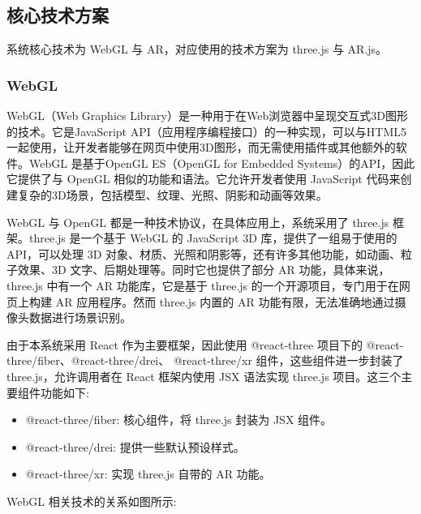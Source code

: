 \subsection{核心技术方案}

系统核心技术为 WebGL 与 AR，对应使用的技术方案为 three.js 与 AR.js。

\subsubsection{WebGL}

WebGL（Web Graphics Library）是一种用于在Web浏览器中呈现交互式3D图形的技术。它是JavaScript API（应用程序编程接口）的一种实现，可以与HTML5一起使用，让开发者能够在网页中使用3D图形，而无需使用插件或其他额外的软件\cite{min2018evaluation}。WebGL 是基于OpenGL ES（OpenGL for Embedded Systems）的API，因此它提供了与 OpenGL 相似的功能和语法。它允许开发者使用 JavaScript 代码来创建复杂的3D场景，包括模型、纹理、光照、阴影和动画等效果\cite{cantor2012webgl}。

WebGL 与 OpenGL 都是一种技术协议，在具体应用上，系统采用了 three.js 框架。three.js 是一个基于 WebGL 的 JavaScript 3D 库，提供了一组易于使用的 API，可以处理 3D 对象、材质、光照和阴影等，还有许多其他功能，如动画、粒子效果、3D 文字、后期处理等\cite{almansoury2020investigating}。同时它也提供了部分 AR 功能，具体来说，three.js 中有一个 AR 功能库，它是基于 three.js 的一个开源项目，专门用于在网页上构建 AR 应用程序。然而 three.js 内置的 AR 功能有限，无法准确地通过摄像头数据进行场景识别。

由于本系统采用 React 作为主要框架，因此使用 @react-three 项目下的 @react-three/fiber、@react-three/drei、 @react-three/xr 组件，这些组件进一步封装了 three.js，允许调用者在 React 框架内使用 JSX 语法实现 three.js 项目。这三个主要组件功能如下:
\begin{itemize}
  \item @react-three/fiber: 核心组件，将 three.js 封装为 JSX 组件。
  \item @react-three/drei: 提供一些默认预设样式。
  \item @react-three/xr: 实现 three.js 自带的 AR 功能。
\end{itemize}

WebGL 相关技术的关系如图所示:

